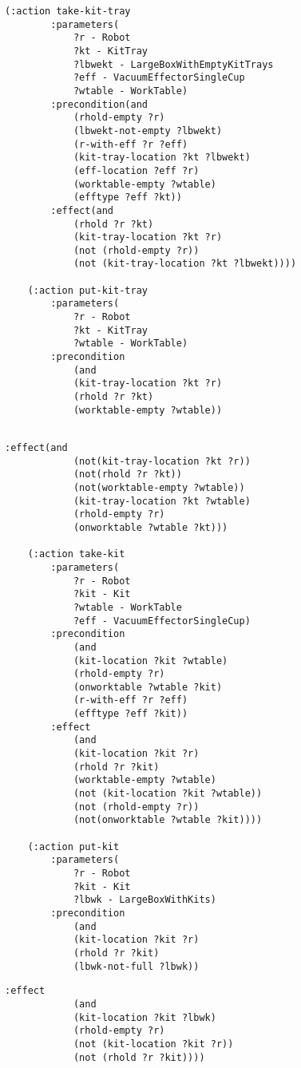 \begin{appendices}
\begin{minipage}{.5\paperwidth}
\begin{mylisting}
\begin{Verbatim}[commandchars=\\\{\},commandchars=+\[\],fontsize=\small,numbersep=3pt]
	(:action take-kit-tray
		:parameters(
			?r - Robot
			?kt - KitTray
			?lbwekt - LargeBoxWithEmptyKitTrays
			?eff - VacuumEffectorSingleCup
			?wtable - WorkTable)
		:precondition(and
			(rhold-empty ?r)
			(lbwekt-not-empty ?lbwekt)
			(r-with-eff ?r ?eff)
			(kit-tray-location ?kt ?lbwekt)
			(eff-location ?eff ?r)
			(worktable-empty ?wtable)
			(efftype ?eff ?kt))
		:effect(and
			(rhold ?r ?kt)
			(kit-tray-location ?kt ?r)
			(not (rhold-empty ?r))
			(not (kit-tray-location ?kt ?lbwekt))))
			
	(:action put-kit-tray
		:parameters(
			?r - Robot
			?kt - KitTray
			?wtable - WorkTable)
		:precondition
			(and
			(kit-tray-location ?kt ?r)
			(rhold ?r ?kt)
			(worktable-empty ?wtable))
		
\end{Verbatim}
\end{mylisting}
\end{minipage}

\begin{minipage}{.5\paperwidth}
\begin{mylisting}
\begin{Verbatim}[commandchars=\\\{\},commandchars=+\[\],fontsize=\small,numbersep=3pt]
		:effect(and
			(not(kit-tray-location ?kt ?r))
			(not(rhold ?r ?kt))
			(not(worktable-empty ?wtable))
			(kit-tray-location ?kt ?wtable)
			(rhold-empty ?r)
			(onworktable ?wtable ?kt)))

	(:action take-kit
		:parameters(
			?r - Robot
			?kit - Kit
			?wtable - WorkTable
			?eff - VacuumEffectorSingleCup)
		:precondition
			(and
			(kit-location ?kit ?wtable)
			(rhold-empty ?r)
			(onworktable ?wtable ?kit)
			(r-with-eff ?r ?eff)
			(efftype ?eff ?kit))
		:effect
			(and
			(kit-location ?kit ?r)
			(rhold ?r ?kit)
			(worktable-empty ?wtable)
			(not (kit-location ?kit ?wtable))
			(not (rhold-empty ?r))
			(not(onworktable ?wtable ?kit))))
			
    (:action put-kit
        :parameters(
			?r - Robot
			?kit - Kit
			?lbwk - LargeBoxWithKits)
		:precondition
			(and
			(kit-location ?kit ?r)
			(rhold ?r ?kit)
			(lbwk-not-full ?lbwk))
\end{Verbatim}
\end{mylisting}
\end{minipage}

\begin{minipage}{.5\paperwidth}
\begin{mylisting}
\begin{Verbatim}[commandchars=\\\{\},commandchars=+\[\],fontsize=\small,numbersep=3pt]
		:effect
			(and
			(kit-location ?kit ?lbwk)
			(rhold-empty ?r)
			(not (kit-location ?kit ?r))
			(not (rhold ?r ?kit))))
			

\end{Verbatim}
\end{mylisting}
\end{minipage}
\end{appendices}
